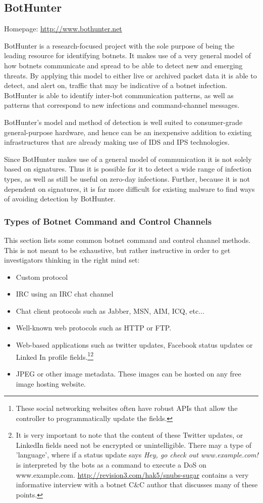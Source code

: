 \documentclass{article}
\theoremstyle{remark}
\theoremstyle{definition}
\theoremstyle{definition}
\theoremstyle{definition}
\begin{document}
\subsection{BotHunter}
Homepage: \url{http://www.bothunter.net}

BotHunter is a research-focused project with the sole purpose of being the leading resource for identifying botnets. It makes use of a very general model of how botnets communicate and spread to be able to detect new and emerging threats. By applying this model to either live or archived packet data it is able to detect, and alert on, traffic that may be indicative of a botnet infection. BotHunter is able to identify inter-bot communication patterns, as well as patterns that correspond to new infections and command-channel messages.

BotHunter's model and method of detection is well suited to consumer-grade general-purpose hardware, and hence can be an inexpensive addition to existing infrastructures that are already making use of IDS and IPS technologies.

Since BotHunter makes use of a general model of communication it is not solely based on signatures. Thus it is possible for it to detect a wide range of infection types, as well as still be useful on zero-day infections. Further, because it is not dependent on signatures, it is far more difficult for existing malware to find ways of avoiding detection by BotHunter.

\subsubsection{Types of Botnet Command and Control Channels}
This section lists some common botnet command and control channel methods. This is not meant to be exhaustive, but rather instructive in order to get investigators thinking in the right mind set:

\begin{itemize}
\item Custom protocol
\item IRC using an IRC chat channel
\item Chat client protocols such as Jabber, MSN, AIM, ICQ, etc...
\item Well-known web protocols such as HTTP or FTP.
\item Web-based applications such as twitter updates, Facebook status updates or Linked In profile fields.\footnote{These social networking websites often have robust APIs that allow the controller to programmatically update the fields.}\footnote{It is very important to note that the content of these Twitter updates, or LinkedIn fields need not be encrypted or unintelligible. There may a type of 'language', where if a status update says \emph{Hey, go check out www.example.com!} is interpreted by the bots as a command to execute a DoS on www.example.com. \url{http://revision3.com/hak5/snubs-sugar} contains a very informative interview with a botnet C\&C author that discusses many of these points.}
\item JPEG or other image metadata. These images can be hosted on any free image hosting website.
\end{itemize}
\end{document}
